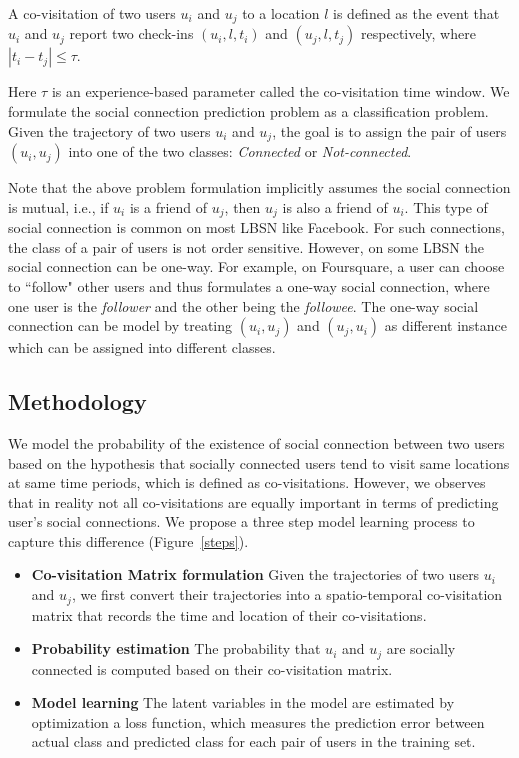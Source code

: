 \begin{definition}[Co-visitation]
A co-visitation of two users $u_i$ and $u_j$ to a location $l$ is defined as the event that $u_i$ and $u_j$ report two check-ins $(u_i, l, t_i)$ and $(u_j, l, t_j)$ respectively, where $| t_i - t_j| \leq \tau$.
\end{definition}

Here $\tau$ is an experience-based parameter called the co-visitation time window. We formulate the social connection prediction problem as a classification problem. Given the trajectory of two users $u_i$ and $u_j$, the goal is to assign the pair of users $(u_i, u_j)$ into one of the two classes: \textit{Connected} or \textit{Not-connected}.

Note that the above problem formulation implicitly assumes the social connection is mutual, i.e., if $u_i$ is a friend of $u_j$, then $u_j$ is also a friend of $u_i$. This type of social connection is common on most LBSN like Facebook. For such connections, the class of a pair of users is not order sensitive. However, on some LBSN the social connection can be one-way. For example, on Foursquare, a user can choose to ``follow" other users and thus formulates a one-way social connection, where one user is the \textit{follower} and the other being the \textit{followee}. The one-way social connection can be model by treating $(u_i, u_j)$ and $(u_j, u_i)$ as different instance which can be assigned into different classes.


\subsection{Methodology} \label{sec:method}

We model the probability of the existence of social connection between two users based on the hypothesis that socially connected users tend to visit same locations at same time periods, which is defined as co-visitations. However, we observes that in reality not all co-visitations are equally important in terms of predicting user's social connections. We propose a three step model learning process to capture this difference (Figure~\ref{steps}).

\begin{itemize}
\item \textbf{Co-visitation Matrix formulation} Given the trajectories of two users $u_i$ and $u_j$, we first convert their trajectories into a spatio-temporal co-visitation matrix that records the time and location of their co-visitations.

\item \textbf{Probability estimation}  The probability that $u_i$ and $u_j$ are socially connected is computed based on their co-visitation matrix.

\item \textbf{Model learning} The latent variables in the model are estimated by optimization a loss function, which measures the prediction error between actual class and predicted class for each pair of users in the training set.
\end{itemize}

